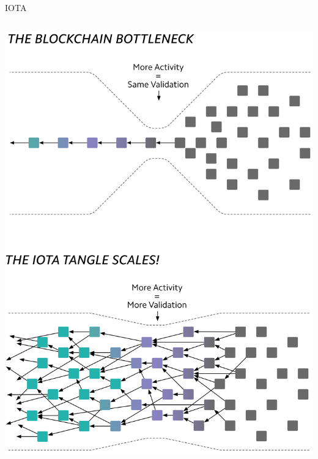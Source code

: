 \begin{frame}{IOTA}
\begin{columns}
        \raggedleft
        \includegraphics[width = \linewidth]{images/tangle.png}
    \end{columns}
\end{frame}


